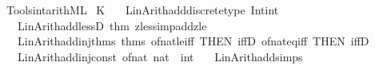 \begin{isabellebody}
\endisatagproof
{\isafoldproof}%
%
\isadelimproof
\isanewline
%
\endisadelimproof
\isanewline
{}\isamarkupfalse%
%
\isadelimdocument
%
\endisadelimdocument
%
\isatagdocument
%
\isamarkuptrue%
%
\endisatagdocument
{\isafolddocument}%
%
\isadelimdocument
%
\endisadelimdocument
%
\isadelimML
%
\endisadelimML
%
\isatagML
{}\isamarkupfalse%
\ {\isacartoucheopen}Tools{\isacharslash}{\kern0pt}int{\isacharunderscore}{\kern0pt}arith{\isachardot}{\kern0pt}ML{\isacartoucheclose}\isanewline
\isanewline
{}\isamarkupfalse%
\ {\isacartoucheopen}K\ {\isacharparenleft}{\kern0pt}\isanewline
\ \ Lin{\isacharunderscore}{\kern0pt}Arith{\isachardot}{\kern0pt}add{\isacharunderscore}{\kern0pt}discrete{\isacharunderscore}{\kern0pt}type\ \isactrltypeUNDERSCOREname {\isasymopen}Int{\isachardot}{\kern0pt}int{\isasymclose}\isanewline
\ \ {\isacharhash}{\kern0pt}{\isachargreater}{\kern0pt}\ Lin{\isacharunderscore}{\kern0pt}Arith{\isachardot}{\kern0pt}add{\isacharunderscore}{\kern0pt}lessD\ {\isacharat}{\kern0pt}{\isacharbraceleft}{\kern0pt}thm\ zless{\isacharunderscore}{\kern0pt}imp{\isacharunderscore}{\kern0pt}add{}{\isacharunderscore}{\kern0pt}zle{\isacharbraceright}{\kern0pt}\isanewline
\ \ {\isacharhash}{\kern0pt}{\isachargreater}{\kern0pt}\ Lin{\isacharunderscore}{\kern0pt}Arith{\isachardot}{\kern0pt}add{\isacharunderscore}{\kern0pt}inj{\isacharunderscore}{\kern0pt}thms\ {\isacharat}{\kern0pt}{\isacharbraceleft}{\kern0pt}thms\ of{\isacharunderscore}{\kern0pt}nat{\isacharunderscore}{\kern0pt}le{\isacharunderscore}{\kern0pt}iff\ {\isacharbrackleft}{\kern0pt}THEN\ iffD{}{\isacharbrackright}{\kern0pt}\ of{\isacharunderscore}{\kern0pt}nat{\isacharunderscore}{\kern0pt}eq{\isacharunderscore}{\kern0pt}iff\ {\isacharbrackleft}{\kern0pt}THEN\ iffD{}{\isacharbrackright}{\kern0pt}{\isacharbraceright}{\kern0pt}\isanewline
\ \ {\isacharhash}{\kern0pt}{\isachargreater}{\kern0pt}\ Lin{\isacharunderscore}{\kern0pt}Arith{\isachardot}{\kern0pt}add{\isacharunderscore}{\kern0pt}inj{\isacharunderscore}{\kern0pt}const\ {\isacharparenleft}{\kern0pt}\isactrlconstUNDERSCOREname {\isasymopen}of{\isacharunderscore}{\kern0pt}nat{\isasymclose}{\isacharcomma}{\kern0pt}\ \isactrltyp {\isasymopen}nat\ {\isasymRightarrow}\ int{\isasymclose}{\isacharparenright}{\kern0pt}\isanewline
\ \ {\isacharhash}{\kern0pt}{\isachargreater}{\kern0pt}\ Lin{\isacharunderscore}{\kern0pt}Arith{\isachardot}{\kern0pt}add{\isacharunderscore}{\kern0pt}simps\isanewline

\end{isabellebody}
